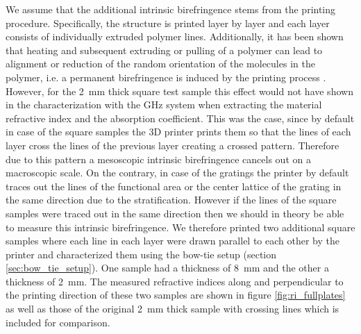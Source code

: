We assume that the additional intrinsic birefringence stems from the printing procedure.
Specifically, the structure is printed layer by layer and each layer consists of individually extruded polymer lines. Additionally, it has been shown that heating and subsequent extruding or pulling of a polymer can lead to alignment or reduction of the random orientation of the molecules in the polymer, i.e. a permanent birefringence is induced by the printing process \cite{Solr-urn:nbn:de:hebis:04-z2017-0786}. However, for the \SI{2}{\milli \meter} thick square test sample this effect would not have shown in the characterization with the GHz system when extracting the material refractive index and the absorption coefficient. This was the case, since by default in case of the square samples the 3D printer prints them so that the lines of each layer cross the lines of the previous layer creating a crossed pattern. Therefore due to this pattern a mesoscopic intrinsic birefringence cancels out on a macroscopic scale. On the contrary, in case of the gratings the printer by default traces out the lines of the functional area or the center lattice of the grating in the same direction due to the stratification. However if the lines of the square samples were traced out in the same direction then we should in theory be able to measure this intrinsic birefringence. We therefore printed two additional square samples where each line in each layer were drawn parallel to each other by the printer and characterized them using the bow-tie setup (section \ref{sec:bow_tie_setup}). One sample had a thickness of \SI{8}{\milli \meter} and the other a thickness of \SI{2}{\milli \meter}. The measured refractive indices along and perpendicular to the printing direction of these two samples are shown in figure \ref{fig:ri_fullplates} as well as those of the original \SI{2}{\milli \meter} thick sample with crossing lines which is included for comparison.

